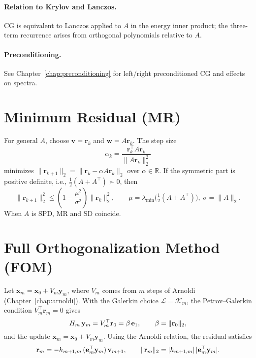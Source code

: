 \paragraph{Relation to Krylov and Lanczos.} CG is equivalent to Lanczos applied to $A$ in the energy inner product; the three-term recurrence arises from orthogonal polynomials relative to $A$.

\paragraph{Preconditioning.} See Chapter~\ref{chap:preconditioning} for left/right preconditioned CG and effects on spectra.



\section{Minimum Residual (MR)}
For general $A$, choose $\mathbf{v}=\mathbf{r}_k$ and $\mathbf{w}=A\mathbf{r}_k$. The step size
\[
  \alpha_k = \frac{\mathbf{r}_k^\top A\mathbf{r}_k}{\|A\mathbf{r}_k\|_2^2}
\]
minimizes $\|\mathbf{r}_{k+1}\|_2=\|\mathbf{r}_k-\alpha A\mathbf{r}_k\|_2$ over $\alpha\in\mathbb{R}$. If the symmetric part is positive definite, i.e., $\tfrac12(A+A^\top)\succ0$, then
\[
  \|\mathbf{r}_{k+1}\|_2^2 \le \left(1-\frac{\mu^2}{\sigma^2}\right)\|\mathbf{r}_k\|_2^2,\qquad \mu=\lambda_{\min}\bigl(\tfrac12(A+A^\top)\bigr),\;\sigma=\|A\|_2.
\]
When $A$ is SPD, MR and SD coincide.

\section{Full Orthogonalization Method (FOM)}
Let $\mathbf{x}_m=\mathbf{x}_0+V_m\mathbf{y}_m$, where $V_m$ comes from $m$ steps of Arnoldi (Chapter~\ref{chap:arnoldi}). With the Galerkin choice $\mathcal{L}=\mathcal{K}_m$, the Petrov--Galerkin condition $V_m^{\top}\mathbf{r}_m=0$ gives
\[
  H_m\,\mathbf{y}_m = V_m^{\top}\mathbf{r}_0 = \beta\,\mathbf{e}_1,\qquad \beta=\lVert\mathbf{r}_0\rVert_2,
\]
and the update $\mathbf{x}_m=\mathbf{x}_0+V_m\mathbf{y}_m$. Using the Arnoldi relation, the residual satisfies
\[
  \mathbf{r}_m = -h_{m+1,m}\,(\mathbf{e}_m^{\top}\mathbf{y}_m)\,\mathbf{v}_{m+1},\qquad \lVert\mathbf{r}_m\rVert_2 = |h_{m+1,m}|\,\lvert\mathbf{e}_m^{\top}\mathbf{y}_m\rvert.
\]

